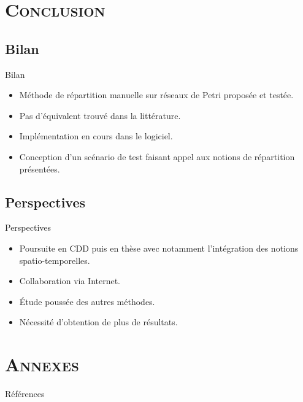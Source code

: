 \section{\scshape Conclusion}
\subsection*{Bilan}
\begin{frame}{Bilan}
	\begin{itemize}
	\item Méthode de répartition manuelle sur réseaux de Petri proposée et testée.
	
	\item Pas d'équivalent trouvé dans la littérature.
	
	\item Implémentation en cours dans le logiciel.
	
	\item Conception d'un scénario de test faisant appel aux notions de répartition présentées.		
	\end{itemize}
\end{frame}

\subsection*{Perspectives}
\begin{frame}{Perspectives}
	\begin{itemize}
		\item Poursuite en \textsc{CDD} puis en thèse avec notamment l'intégration des notions spatio-temporelles.
			
		\item Collaboration via Internet.
			
		\item Étude poussée des autres méthodes.
			
		\item Nécessité d'obtention de plus de résultats.
	\end{itemize}
\end{frame}

\section*{\scshape Annexes}
{\small
	\begin{frame}[allowframebreaks]{Références}
		
		
		
		
	\end{frame}
}
